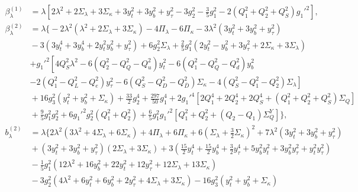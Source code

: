 \documentclass[preprint,amsmath,amssymb,aps,superscriptaddress,prd,showpacs,floatfix,nofootinbib]{revtex4-1}
\begin{document}
\begin{subequations}\label{eq:USSMLambdaBetas}
\begin{align}
\beta_\lambda^{(1)}&=\lambda  \left[2\lambda ^2+2 \Sigma_\lambda +3 \Sigma_\kappa +3 y_t^2+3 y_b^2+y_{\tau }^2-3 g_2^2-\frac{3}{5} g_1^2 -2 \left ( Q_1^2 + Q_2^2 + Q_S^2\right )g_1'^2 \right],\label{eq:USSMLambdaBetaOneLoop}\\
\beta_\lambda^{(2)}&=\lambda \bigg \{ -2\lambda^2\left ( \lambda^2+2\Sigma_\lambda+3\Sigma_\kappa\right )-4\Pi_\lambda-6\Pi_\kappa-3\lambda^2\left ( 3y_t^2+3y_b^2+y_\tau^2\right ) \nonumber\\
&{} -3\left ( 3y_t^4+3y_b^4+2y_t^2y_b^2+y_\tau^2 \right )+6g_2^2\Sigma_\lambda+\frac{2}{5}g_1^2\left ( 2y_t^2-y_b^2+3y_\tau^2+2\Sigma_\kappa +3\Sigma_\lambda\right )\nonumber\\
&{}\left.+g_1'^2\left [ 4Q_S^2\lambda^2 -6\left ( Q_2^2-Q_Q^2-Q_u^2\right )y_t^2-6\left ( Q_1^2-Q_Q^2-Q_d^2\right )y_b^2 \right.\right.\nonumber\\
&{}\left.-2\left ( Q_1^2-Q_L^2-Q_e^2\right )y_\tau^2-6\left ( Q_S^2-Q_D^2-Q_{\overline{D}}^2 \right )\Sigma_\kappa-4\left ( Q_S^2-Q_1^2-Q_2^2\right )\Sigma_\lambda\right ]\nonumber\\
&{}+16g_3^2\left ( y_t^2+y_b^2+\Sigma_\kappa\right ) +\frac{33}{2}g_2^4+\frac{297}{50}g_1^4+2g_1'^4\left [ 2Q_1^4+2Q_2^4+2Q_S^4+\left ( Q_1^2+Q_2^2+Q_S^2\right )\Sigma_{Q}\right ]\nonumber\\
&{}+\frac{9}{5}g_1^2g_2^2+6g_1'^2g_2^2\left ( Q_1^2+Q_2^2\right )+\frac{6}{5}g_1^2g_1'^2\left [Q_1^2+Q_2^2+\left ( Q_2 - Q_1 \right )\Sigma_Q^Y\right ]\bigg \},\label{eq:USSMLambdaBetaTwoLoop}\\
b_\lambda^{(2)}&=\lambda \bigg \{ 2\lambda^2\left ( 3\lambda^2 +4\Sigma_\lambda +6\Sigma_\kappa \right )+4\Pi_\lambda + 6\Pi_\kappa +6\left ( \Sigma_\lambda+\frac{3}{2}\Sigma_\kappa\right )^2+7\lambda^2\left ( 3y_t^2+3y_b^2+y_\tau^2\right )\nonumber\\
&{}+\left ( 3y_t^2+3y_b^2+y_\tau^2\right )\left (2\Sigma_\lambda+3\Sigma_\kappa\right ) +3\left ( \frac{15}{2}y_t^4+\frac{15}{2}y_b^4+\frac{3}{2}y_\tau^4 +5y_b^2y_t^2 +3y_b^2y_\tau^2 +y_t^2y_\tau^2\right )\nonumber\\
&{}-\frac{1}{5}g_1^2\left ( 12\lambda^2+16y_b^2+22y_t^2+12y_\tau^2+12\Sigma_\lambda +13\Sigma_\kappa \right )\nonumber\\
&{}-3g_2^2\left ( 4\lambda^2+6y_t^2+6y_b^2+2y_\tau^2+4\Sigma_\lambda+3\Sigma_\kappa\right )-16g_3^2\left ( y_t^2+y_b^2+\Sigma_\kappa \right )\nonumber\\

\end{align}
\end{subequations}
\end{document}
